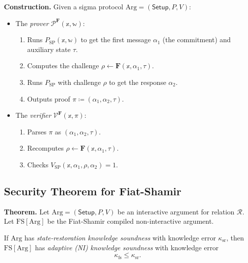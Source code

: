 \documentclass[11pt]{article}
\theoremstyle{plain}
\theoremstyle{definition}
\newcommand{\Pro}{\mathcal{P}}
\newcommand{\Ver}{\mathcal{V}}
\newcommand{\RO}{\mathbf{F}}   %
\begin{document}
\noindent\textbf{Construction.} Given a sigma protocol $\mathrm{Arg} = (\mathsf{Setup}, P, V)$:
\begin{itemize}
  \item The \emph{prover} $\Pro^{\RO}(\mathbb{x}, \mathbb{w})$:
    \begin{enumerate}
      \item Runs $P_{\mathrm{SP}}(\mathbb{x}, \mathbb{w})$ to get the first message $\alpha_1$
            (the commitment) and auxiliary state $\tau$.
      \item Computes the challenge $\rho \leftarrow \RO(\mathbb{x}, \alpha_1, \tau)$.
      \item Runs $P_{\mathrm{SP}}$ with challenge $\rho$ to get the response $\alpha_2$.
      \item Outputs proof $\pi \coloneqq (\alpha_1, \alpha_2, \tau)$.
    \end{enumerate}
  \item The \emph{verifier} $\Ver^{\RO}(\mathbb{x}, \pi)$:
    \begin{enumerate}
      \item Parses $\pi$ as $(\alpha_1, \alpha_2, \tau)$.
      \item Recomputes $\rho \leftarrow \RO(\mathbb{x}, \alpha_1, \tau)$.
      \item Checks $V_{\mathrm{SP}}(\mathbb{x}, \alpha_1, \rho, \alpha_2) = 1$.
    \end{enumerate}
\end{itemize}

\subsection{Security Theorem for Fiat-Shamir}

\begin{tcolorbox}[title={Theorem: Security of Fiat-Shamir},
                  colback=yellow!10, colframe=orange!60!black, breakable]
\textbf{Theorem.}
Let $\mathrm{Arg} = (\mathsf{Setup}, P, V)$ be an interactive argument for
relation $\mathcal{R}$.  Let $\mathrm{FS}[\mathrm{Arg}]$ be the Fiat-Shamir
compiled non-interactive argument.

If $\mathrm{Arg}$ has \emph{state-restoration knowledge soundness} with
knowledge error $\kappa_{\mathrm{sr}}$, then $\mathrm{FS}[\mathrm{Arg}]$ has
\emph{adaptive (NI) knowledge soundness} with knowledge error
\[
  \kappa_{\mathrm{fs}} \le \kappa_{\mathrm{sr}}.
\]
\end{tcolorbox}
\end{document}
